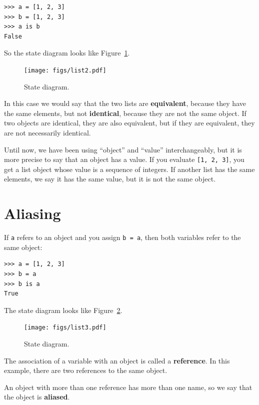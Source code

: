 \documentclass[10pt]{book}
\begin{document}
\begin{verbatim}
>>> a = [1, 2, 3]
>>> b = [1, 2, 3]
>>> a is b
False
\end{verbatim}
%
So the state diagram looks like Figure~\ref{fig.list2}.

\begin{figure}
\centerline
{\texttt{[image: figs/list2.pdf]}}
\caption{State diagram.}
\label{fig.list2}
\end{figure}

In this case we would say that the two lists are {\bf equivalent},
because they have the same elements, but not {\bf identical}, because
they are not the same object.  If two objects are identical, they are
also equivalent, but if they are equivalent, they are not necessarily
identical.

Until now, we have been using ``object'' and ``value''
interchangeably, but it is more precise to say that an object has a
value.  If you evaluate {\tt [1, 2, 3]}, you get a list
object whose value is a sequence of integers.  If another
list has the same elements, we say it has the same value, but
it is not the same object.


\section{Aliasing}

If {\tt a} refers to an object and you assign {\tt b = a},
then both variables refer to the same object:

\begin{verbatim}
>>> a = [1, 2, 3]
>>> b = a
>>> b is a
True
\end{verbatim}
%
The state diagram looks like Figure~\ref{fig.list3}.

\begin{figure}
\centerline
{\texttt{[image: figs/list3.pdf]}}
\caption{State diagram.}
\label{fig.list3}
\end{figure}

The association of a variable with an object is called a {\bf
reference}.  In this example, there are two references to the same
object.

An object with more than one reference has more
than one name, so we say that the object is {\bf aliased}.
\end{document}
